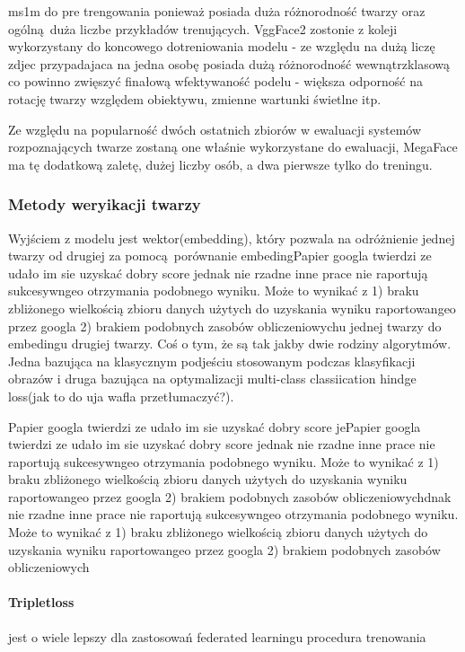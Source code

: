 ms1m do pre trengowania ponieważ posiada duża różnorodność twarzy oraz ogólną duża liczbe przykładów trenujących. VggFace2 zostonie z koleji wykorzystany do koncowego dotreniowania modelu - ze względu na dużą liczę zdjec przypadajaca na jedna osobę posiada dużą różnorodność wewnątrzklasową co powinno zwięszyć finałową wfektywaność podelu - większa odporność na rotację twarzy względem obiektywu, zmienne wartunki świetlne itp.

Ze względu na popularność dwóch ostatnich zbiorów w ewaluacji systemów rozpoznających twarze zostaną one właśnie wykorzystane do ewaluacji, MegaFace ma tę dodatkową zaletę, dużej liczby osób, a dwa pierwsze tylko do treningu.



\subsubsection{Metody weryikacji twarzy}
Wyjściem z modelu jest wektor(embedding), który pozwala na odróżnienie jednej twarzy od drugiej za pomocą porównanie 
embedingPapier googla twierdzi ze udało im sie uzyskać dobry score jednak nie rzadne inne prace nie raportują sukcesywngeo otrzymania podobnego wyniku. Może to wynikać z 1) braku zbliżonego wielkością zbioru danych użytych do uzyskania wyniku raportowangeo przez googla  2) brakiem podobnych zasobów obliczeniowychu jednej twarzy do embedingu drugiej twarzy.
Coś o tym, że są tak jakby dwie rodziny algorytmów. Jedna bazująca na klasycznym podjeściu stosowanym podczas klasyfikacji obrazów i druga bazująca na optymalizacji multi-class classiication hindge loss(jak to do uja wafla przetłumaczyć?).

Papier googla twierdzi ze udało im sie uzyskać dobry score jePapier googla twierdzi ze udało im sie uzyskać dobry score jednak nie rzadne inne prace nie raportują sukcesywngeo otrzymania podobnego wyniku. Może to wynikać z 1) braku zbliżonego wielkością zbioru danych użytych do uzyskania wyniku raportowangeo przez googla  2) brakiem podobnych zasobów obliczeniowychdnak nie rzadne inne prace nie raportują sukcesywngeo otrzymania podobnego wyniku. Może to wynikać z 1) braku zbliżonego wielkością zbioru danych użytych do uzyskania wyniku raportowangeo przez googla  2) brakiem podobnych zasobów obliczeniowych

\paragraph{Tripletloss}
jest o wiele lepszy dla zastosowań federated learningu
procedura trenowania


